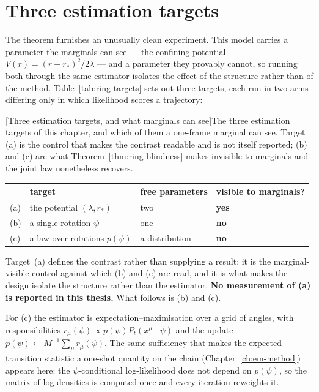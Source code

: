 \section{Three estimation targets}\label{sec:ring-estimation}

The theorem furnishes an unusually clean experiment. This model carries a
parameter the marginals can see --- the confining potential
$V(r) = (r-r_*)^2/2\lambda$ --- and a parameter they provably cannot, so
running both through the same estimator isolates the effect of the structure
rather than of the method. Table~\ref{tab:ring-targets} sets out three targets,
each run in two arms differing only in which likelihood scores a trajectory:

\begin{center}
\begin{minipage}{\linewidth}\small\centering
{}[Three estimation targets, and what marginals can see]{The three estimation targets of this chapter, and which of them a one-frame marginal can see. Target (a) is the control that makes the contrast readable and is not itself reported; (b) and (c) are what Theorem~\ref{thm:ring-blindness} makes invisible to marginals and the joint law nonetheless recovers.}
\label{tab:ring-targets}
\begin{tabular}{@{}llll@{}}
\toprule
 & target & free parameters & visible to marginals? \\
\midrule
(a) & the potential $(\lambda, r_*)$ & two & \textbf{yes} \\
(b) & a single rotation $\psi$ & one & \textbf{no} \\
(c) & a law over rotations $p(\psi)$ & a distribution & \textbf{no} \\
\bottomrule
\end{tabular}
\end{minipage}
\end{center}

\noindent Target~(a) defines the contrast rather than supplying a result: it is
the marginal-visible control against which (b) and (c) are read, and it is what
makes the design isolate the structure rather than the estimator. \textbf{No
measurement of (a) is reported in this thesis.} What follows is (b) and (c).

For (c) the estimator is expectation--maximisation over a grid of angles, with
responsibilities $r_\mu(\psi)\propto p(\psi)P_t(x^\mu\mid\psi)$ and the
update $p(\psi)\leftarrow M^{-1}\sum_\mu r_\mu(\psi)$. The same sufficiency
that makes the expected-transition statistic a one-shot quantity on the chain
(Chapter~\ref{ch:em-method}) appears here: the $\psi$-conditional
log-likelihood does not depend on $p(\psi)$, so the matrix of log-densities is
computed once and every iteration reweights it.

